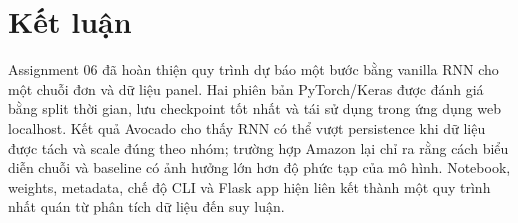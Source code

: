 \documentclass[12pt,a4paper]{report}
\begin{document}
\section{Kết luận}
Assignment 06 đã hoàn thiện quy trình dự báo một bước bằng vanilla RNN cho một chuỗi đơn và dữ liệu panel.
Hai phiên bản PyTorch/Keras được đánh giá bằng split thời gian, lưu checkpoint tốt nhất và tái sử dụng trong
ứng dụng web localhost. Kết quả Avocado cho thấy RNN có thể vượt persistence khi dữ liệu được tách và scale
đúng theo nhóm; trường hợp Amazon lại chỉ ra rằng cách biểu diễn chuỗi và baseline có ảnh hưởng lớn hơn độ
phức tạp của mô hình. Notebook, weights, metadata, chế độ CLI và Flask app hiện liên kết thành một quy trình
nhất quán từ phân tích dữ liệu đến suy luận.
\end{document}
